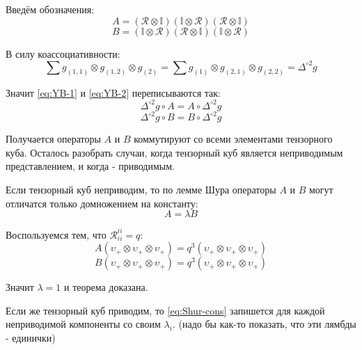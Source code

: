 \documentclass[12pt,a4paper]{article}
\begin{document}
Введём обозначения:
\begin{equation}
    A = (\mathcal{R} 
    \otimes \mathbb{I})(\mathbb{I} \otimes \mathcal{R})
    (\mathcal{R} \otimes \mathbb{I})
\end{equation}
\begin{equation}
    B = (\mathbb{I} \otimes \mathcal{R})
    (\mathcal{R} \otimes \mathbb{I}) (\mathbb{I} \otimes \mathcal{R})
\end{equation}

В силу коассоциативности:
\begin{equation}
    \sum g_{(1, 1)} \otimes g_{(1,2)} \otimes g_{(2)} = 
    \sum g_{(1)} \otimes g_{(2,1)} \otimes g_{(2, 2)} =
    \Delta^{\circ 2} g
\end{equation}

Значит \eqref{eq:YB-1} и \eqref{eq:YB-2} переписываются так:
\begin{equation}
    \Delta^{\circ 2} g \circ A = A \circ \Delta^{\circ 2} g
\end{equation}
\begin{equation}
    \Delta^{\circ 2} g \circ B = B \circ \Delta^{\circ 2} g
\end{equation}

Получается операторы $A$ и $B$ коммутируют со всеми элементами
тензорного куба. Осталось разобрать случаи, когда тензорный куб
является неприводимым представлением, и когда - приводимым.

Если тензорный куб неприводим, то по лемме Шура операторы $A$ и $B$
могут отличатся только домножением на константу:
\begin{equation}
    A = \lambda B
    \label{eq:Shur-cons}
\end{equation}

Воспользуемся тем, что $\mathcal{R}^{ii}_{ii} = q$:
\begin{equation}
    A(\upsilon_+ \otimes \upsilon_+ \otimes \upsilon_+) = q^3 (\upsilon_+ \otimes \upsilon_+ \otimes \upsilon_+)
\end{equation}
\begin{equation}
    B(\upsilon_+ \otimes \upsilon_+ \otimes \upsilon_+) = q^3 (\upsilon_+ \otimes \upsilon_+ \otimes \upsilon_+)
\end{equation}

Значит $\lambda = 1$ и теорема доказана.

Если же тензорный куб приводим, то \eqref{eq:Shur-cons} запишется
для каждой неприводимой компоненты со своим $\lambda_i$. (надо бы
как-то показать, что эти лямбды - единички)
\printbibliography
\end{document}
